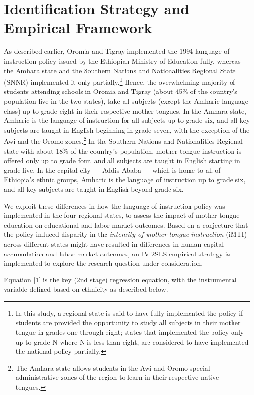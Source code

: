 
\section{Identification Strategy and Empirical Framework}

As described earlier, Oromia and Tigray implemented the 1994 language of instruction policy issued by the Ethiopian Ministry of Education fully, whereas the Amhara state and the Southern Nations and Nationalities Regional State (SNNR) implemented it only partially.\footnote{In this study, a regional state is said to have fully implemented the policy if students are provided the opportunity to study all subjects in their mother tongue in grades one through eight; states that implemented the policy only up to grade N where N is less than eight, are considered to have implemented the national policy partially.} Hence, the overwhelming majority of students attending schools in Oromia and Tigray (about 45\% of the country’s population live in the two states), take all subjects (except the Amharic language class) up to grade eight in their respective mother tongues. In the Amhara state, Amharic is the language of instruction for all subjects up to grade six, and all key subjects are taught in English beginning in grade seven, with the exception of the Awi and the Oromo zones.\footnote{The Amhara state allows students in the Awi and Oromo special administrative zones of the region to learn in their respective native tongues.} In the Southern Nations and Nationalities Regional state with about 18\% of the country’s population, mother tongue instruction is offered only up to grade four, and all subjects are taught in English starting in grade five. In the capital city --- Addis Ababa --- which is home to all of Ethiopia’s ethnic groups, Amharic is the language of instruction up to grade six, and all key subjects are taught in English beyond grade six.

We exploit these differences in how the language of instruction policy was implemented in the four regional states, to assess the impact of mother tongue education on educational and labor market outcomes. Based on a conjecture that the policy-induced disparity in the \emph{intensity of mother tongue instruction} (iMTI) across different states might have resulted in differences in human capital accumulation and labor-market outcomes, an IV-2SLS empirical strategy is implemented to explore the research question under consideration.   

Equation [1] is the key (2nd stage) regression equation, with the instrumental variable defined based on ethnicity as described below.




